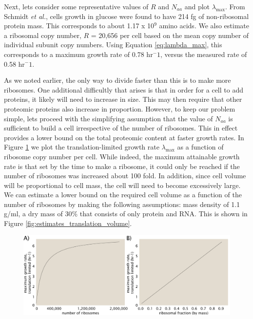 \documentclass[11pt, letterpaper]{article}
\begin{document}
Next, lets consider some representative values of $R$ and $N_{aa}$ and plot
$\lambda_{\text{max}}$. From Schmidt {\it et al.}, cells growth in glucose were
found to have 214 fg of non-ribosomal  protein mass. This corresponds to about
1.17 x 10$^9$ amino acids. We also estimate a  ribosomal copy number, $R$ =
20,656 per cell based on the mean copy number of individual subunit copy
numbers. Using Equation \ref{eq:lambda_max}, this corresponds to a maximum
growth rate of 0.78 hr$^-1$, versus the measured rate of 0.58 hr$^-1$.

As we noted earlier, the only way to divide faster than this is to make more
ribosomes. One additional difficultly that arises is that in order for a cell to
add proteins, it likely will need to increase in size. This may then require
that other proteomic proteins also increase in proportion. However, to keep our
problem simple, lets proceed with the simplifying assumption that the value of
$N_{aa}$ is sufficient to build a cell irrespective of the number of ribosomes.
This in effect provides a lower bound on the total proteomic content at faster
growth rates. In Figure \ref{fig:estimates_translation_toy_1} we plot the translation-limited growth rate
$\lambda_{\text{max}}$ as a function of ribosome copy number per cell. While indeed,
the maximum attainable growth rate is that set by the time to make a ribosome,
it could only be reached if the number of ribosomes was increased about 100 fold.
In addition, since cell volume will be proportional to cell mass, the cell will need
to become excessively large. We can estimate a lower bound on the required cell
volume as a function of the number of ribosomes by making the following assumptions:  mass density of 1.1
g/ml, a dry mass of 30\% that consists of only protein and RNA.  This is shown
in Figure \ref{fig:estimates_translation_volume}.

\begin{figure}[H]
		\centering
    \includegraphics[width=1\textwidth]{../../code/figures/SI/estimates_translation_toy_1.pdf}
  \caption{}
  \label{fig:estimates_translation_toy_1}
\end{figure}
\end{document}
